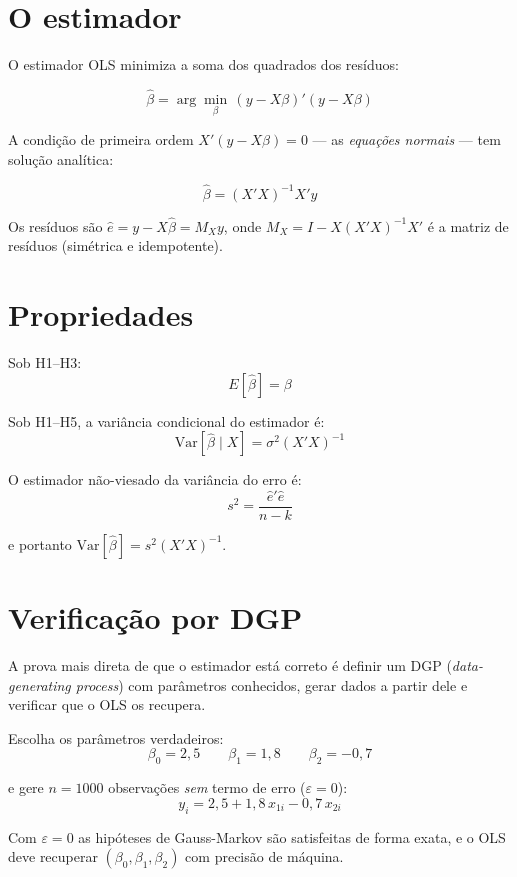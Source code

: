 \section{O estimador}

O estimador OLS minimiza a soma dos quadrados dos resíduos:

\[
  \hat{\beta} = \arg\min_{\beta}\, (y - X\beta)'(y - X\beta)
\]

A condição de primeira ordem $X'(y - X\beta) = 0$ — as \emph{equações normais} —
tem solução analítica:

\[
  \boxed{\hat{\beta} = (X'X)^{-1}X'y}
\]

Os resíduos são $\hat{e} = y - X\hat{\beta} = M_X y$, onde
$M_X = I - X(X'X)^{-1}X'$ é a matriz de resíduos (simétrica e idempotente).

\section{Propriedades}

Sob H1–H3:
\[
  E[\hat{\beta}] = \beta
\]

Sob H1–H5, a variância condicional do estimador é:
\[
  \mathrm{Var}[\hat{\beta} \mid X] = \sigma^2 (X'X)^{-1}
\]

O estimador não-viesado da variância do erro é:
\[
  s^2 = \frac{\hat{e}'\hat{e}}{n - k}
\]

e portanto $\widehat{\mathrm{Var}}[\hat{\beta}] = s^2 (X'X)^{-1}$.

\section{Verificação por DGP}

A prova mais direta de que o estimador está correto é definir um DGP
(\emph{data-generating process}) com parâmetros conhecidos, gerar dados
a partir dele e verificar que o OLS os recupera.

Escolha os parâmetros verdadeiros:
\[
  \beta_0 = 2{,}5 \qquad \beta_1 = 1{,}8 \qquad \beta_2 = -0{,}7
\]

e gere $n = 1000$ observações \emph{sem} termo de erro ($\varepsilon = 0$):
\[
  y_i = 2{,}5 + 1{,}8\,x_{1i} - 0{,}7\,x_{2i}
\]

Com $\varepsilon = 0$ as hipóteses de Gauss-Markov são satisfeitas de forma
exata, e o OLS deve recuperar $(\beta_0, \beta_1, \beta_2)$ com precisão
de máquina.

